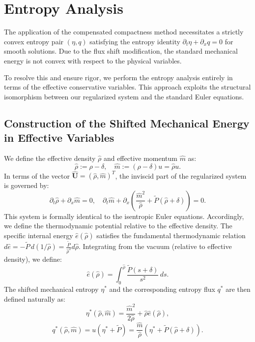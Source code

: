 \documentclass[12pt, reqno]{article}
\theoremstyle{definition}
\newcommand{\pa}{\partial}
\numberwithin{equation}{section}
\begin{document}
\section{Entropy Analysis}
\label{sec:entropy}

The application of the compensated compactness method necessitates a strictly convex entropy pair $(\eta, q)$ satisfying the entropy identity $\pa_t \eta + \pa_x q = 0$ for smooth solutions. Due to the flux shift modification, the standard mechanical energy is not convex with respect to the physical variables. 

To resolve this and ensure rigor, we perform the entropy analysis entirely in terms of the effective conservative variables. This approach exploits the structural isomorphism between our regularized system and the standard Euler equations.

\subsection{Construction of the Shifted Mechanical Energy in Effective Variables}

We define the effective density $\hat{\rho}$ and effective momentum $\hat{m}$ as:
\begin{equation}
    \hat{\rho} := \rho - \delta, \quad \hat{m} := (\rho - \delta)u = \hat{\rho} u.
\end{equation}
In terms of the vector $\hat{\mathbf{U}} = (\hat{\rho}, \hat{m})^T$, the inviscid part of the regularized system is governed by:
\begin{equation} \label{eq:effective_euler_system}
    \pa_t \hat{\rho} + \pa_x \hat{m} = 0, \quad \pa_t \hat{m} + \pa_x \left( \frac{\hat{m}^2}{\hat{\rho}} + \tilde{P}(\hat{\rho}+\delta) \right) = 0.
\end{equation}
This system is formally identical to the isentropic Euler equations. Accordingly, we define the thermodynamic potential relative to the effective density. The specific internal energy $\hat{e}(\hat{\rho})$ satisfies the fundamental thermodynamic relation $d\hat{e} = - \tilde{P} \, d(1/\hat{\rho}) = \frac{\tilde{P}}{\hat{\rho}^2} d\hat{\rho}$. Integrating from the vacuum (relative to effective density), we define:
\begin{equation} \label{eq:shifted_internal_energy}
    \hat{e}(\hat{\rho}) = \int_{0}^{\hat{\rho}} \frac{\tilde{P}(s+\delta)}{s^2} \, ds.
\end{equation}
The shifted mechanical entropy $\eta^*$ and the corresponding entropy flux $q^*$ are then defined naturally as:
\begin{equation} \label{eq:shifted_entropy_def}
    \eta^*(\hat{\rho}, \hat{m}) = \frac{\hat{m}^2}{2\hat{\rho}} + \hat{\rho} \hat{e}(\hat{\rho}),
\end{equation}
\begin{equation} \label{eq:shifted_flux_def}
    q^*(\hat{\rho}, \hat{m}) = u(\eta^* + \tilde{P}) = \frac{\hat{m}}{\hat{\rho}} \left( \eta^* + \tilde{P}(\hat{\rho}+\delta) \right).
\end{equation}
\end{document}
